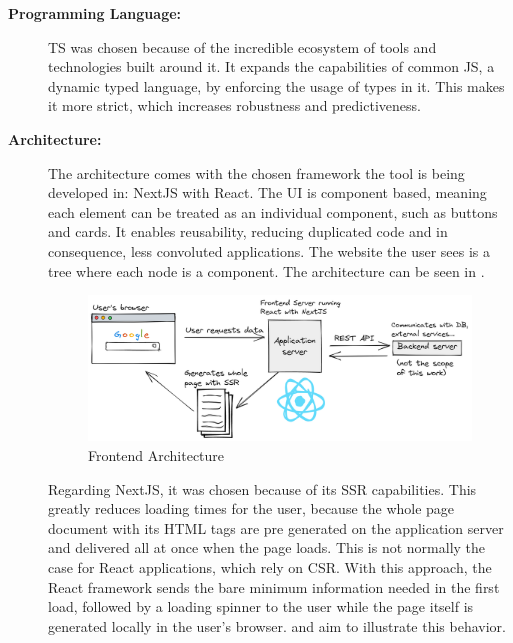 \begin{description}
  \item[\textbf{Programming Language:}] \ac{TS} was chosen because of the incredible ecosystem of tools and technologies built around it. It expands the capabilities of common \ac{JS}, a dynamic typed language, by enforcing the usage of types in it. This makes it more strict, which increases robustness and predictiveness.
  \item[\textbf{Architecture:}] The architecture comes with the chosen framework the tool is being developed in: NextJS with React. The \ac{UI} is component based, meaning each element can be treated as an individual component, such as buttons and cards. It enables reusability, reducing duplicated code and in consequence, less convoluted applications. The website the user sees is a tree where each node is a component. The architecture can be seen in .

    \begin{figure}[!htb]
      \caption{Frontend Architecture}\label{fig:arch}
      \begin{center}
        \includegraphics[width=14cm]{img/6-architecture.png}
      \end{center}
    \end{figure}

    Regarding NextJS, it was chosen because of its \ac{SSR} capabilities. This greatly reduces loading times for the user, because the whole page document with its \ac{HTML} tags are pre generated on the application server and delivered all at once when the page loads. This is not normally the case for React applications, which rely on \ac{CSR}. With this approach, the React framework sends the bare minimum information needed in the first load, followed by a loading spinner to the user while the page itself is generated locally in the user's browser.  and  aim to illustrate this behavior.


\end{description}
